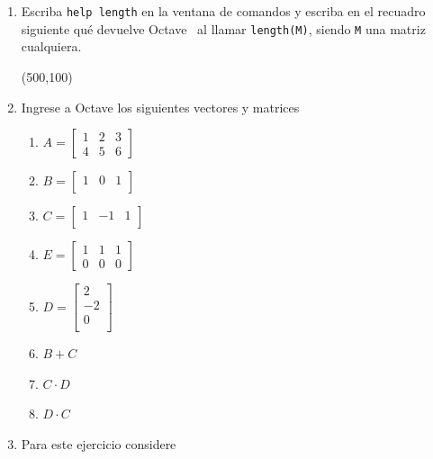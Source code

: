 \documentclass[letter,11pt]{article}
\newcommand\0{\mathbf{0}}
\newcommand{\octave}{{\sc Octave }}
\begin{document}
\begin{enumerate}
\item	Escriba \texttt{help length} en la ventana de comandos y escriba en el recuadro siguiente qu\'e   devuelve \octave\, al llamar \texttt{length(M)}, siendo \texttt{M} una   matriz cualquiera.

\framebox(500,100){}

\item Ingrese a \octave los siguientes vectores y matrices
\begin{multicols}{4}
\begin{enumerate}
	\item 
    $A=\begin{bmatrix}
    1 & 2 & 3 \\
    4 & 5 & 6
	\end{bmatrix}$

	\item 
    $B=\begin{bmatrix}
    1 & 0 &1 \\
	\end{bmatrix}$
    
    \item 
    $C=\begin{bmatrix}
    1&-1&1 \\
	\end{bmatrix}$
    
        \item 
    $E=\begin{bmatrix}
    1&1&1 \\ 0 & 0 & 0 
	\end{bmatrix}$
    
        \item 
    $D=\begin{bmatrix}
    2\\-2\\0 \\
	\end{bmatrix}$
    
    \item $B+C$

	\item $C\cdot D$
    
    \item $D \cdot C$
\end{enumerate}
\end{multicols}

\item Para este ejercicio considere


\end{enumerate}
\end{document}
